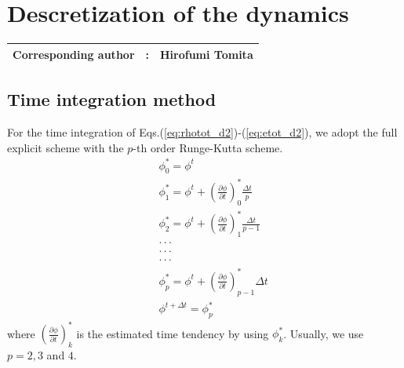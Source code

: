 \chapter{Descretization of the dynamics}
{\bf \Large 
\begin{tabular}{ccc}
\hline
  Corresponding author & : & Hirofumi Tomita\\
\hline
\end{tabular}
}

\section{Time integration method}

For the time integration of Eqs.(\ref{eq:rhotot_d2})-(\ref{eq:etot_d2}),
we adopt the full explicit scheme with
the $p$-th order Runge-Kutta scheme.
\begin{eqnarray}
&& \phi^{*}_{0} = \phi^{t}\\
&&  \phi^{*}_{1} 
= \phi^{t} + \left(\frac{\partial \phi}{\partial t}\right)^{*}_{0}\frac{\Delta t}{p}\\
&&  \phi^{*}_{2} 
= \phi^{t} + \left(\frac{\partial \phi}{\partial t}\right)^{*}_{1}\frac{\Delta t}{p-1}\\
&&  \cdot \cdot \cdot\nonumber\\
&&  \cdot \cdot \cdot\nonumber\\
&&  \cdot \cdot \cdot\nonumber\\
&&  \phi^{*}_{p} = \phi^{t} + \left(\frac{\partial \phi}{\partial t}\right)^{*}_{p-1} \Delta t\\
&& \phi^{t+\Delta t} = \phi^{*}_{p}
\end{eqnarray}
where $\left(\frac{\partial \phi}{\partial t}\right)^{*}_{k}$ is 
the estimated time tendency by using $\phi^{*}_{k}$.
Usually, we use $p=2,3$ and $4$.

